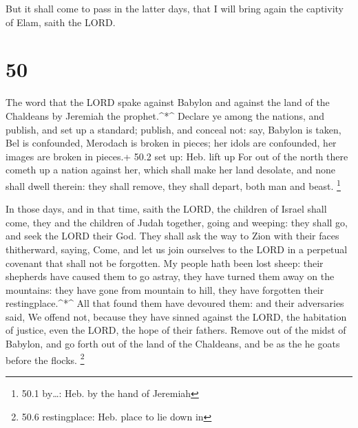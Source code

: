  But it shall come to pass in the latter days, that I will
bring again the captivity of Elam, saith the LORD.

\hypertarget{section-49}{%
\section{50}\label{section-49}}

 The word that the LORD spake against Babylon and against
the land of the Chaldeans by Jeremiah the prophet.\^{}*\^{} 
Declare ye among the nations, and publish, and set up a standard;
publish, and conceal not: say, Babylon is taken, Bel is confounded,
Merodach is broken in pieces; her idols are confounded, her images are
broken in pieces.+ 50.2 set up: Heb. lift up  For out of the
north there cometh up a nation against her, which shall make her land
desolate, and none shall dwell therein: they shall remove, they shall
depart, both man and beast. \footnote{50.1 by\ldots: Heb. by the hand of
  Jeremiah}

 In those days, and in that time, saith the LORD, the
children of Israel shall come, they and the children of Judah together,
going and weeping: they shall go, and seek the LORD their God.
 They shall ask the way to Zion with their faces
thitherward, saying, Come, and let us join ourselves to the LORD in a
perpetual covenant that shall not be forgotten.  My people
hath been lost sheep: their shepherds have caused them to go astray,
they have turned them away on the mountains: they have gone from
mountain to hill, they have forgotten their restingplace.\^{}*\^{}
 All that found them have devoured them: and their
adversaries said, We offend not, because they have sinned against the
LORD, the habitation of justice, even the LORD, the hope of their
fathers.  Remove out of the midst of Babylon, and go forth
out of the land of the Chaldeans, and be as the he goats before the
flocks. \footnote{50.6 restingplace: Heb. place to lie down in}

